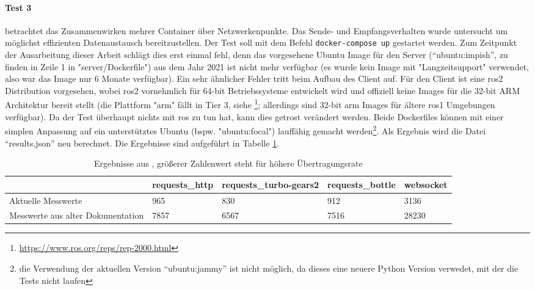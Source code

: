 \paragraph*{Test 3} betrachtet das Zusammenwirken mehrer Container über Netzwerkenpunkte. Das Sende- und Empfangsverhalten wurde untersucht um möglichst effizienten Datenaustausch bereitzustellen. Der Test soll mit dem Befehl \texttt{docker-compose up} gestartet werden. Zum Zeitpunkt der Ausarbeitung dieser Arbeit schlägt dies erst einmal fehl, denn das vorgesehene Ubuntu Image für den Server (\enquote{ubuntu:impish}, zu finden in Zeile 1 in "server/Dockerfile") aus dem Jahr 2021 ist nicht mehr verfügbar (es wurde kein Image mit "Langzeitsupport" verwendet, also war das Image nur 6 Monate verfügbar). Ein sehr ähnlicher Fehler tritt beim Aufbau des Client auf. Für den Client ist eine \acrshort{ros}2 Distribution vorgesehen, wobei \acrshort{ros}2 vornehmlich für 64-bit Betriebssysteme entwickelt wird und offiziell keine Images für die 32-bit ARM Architektur bereit stellt (die Plattform "arm" fällt in Tier 3, siehe \footnote{\url{https://www.ros.org/reps/rep-2000.html}}; allerdings sind 32-bit arm Images für ältere \acrshort{ros}1 Umgebungen verfügbar). Da der Test überhaupt nichts mit \acrshort{ros} zu tun hat, kann dies getrost verändert werden. Beide Dockerfiles können mit einer simplen Anpassung auf ein unterstütztes Ubuntu (bspw. "ubuntu:focal") lauffähig gemacht werden\footnote{die Verwendung der aktuellen Version \enquote{ubuntu:jammy} ist nicht möglich, da dieses eine neuere Python Version verwedet, mit der die Tests nicht laufen}. Als Ergebnis wird die Datei \enquote{results.json} neu berechnet. Die Ergebnisse sind aufgeführt in Tabelle \ref{tab:bench_http}. 

\begin{table}[h]
    \begin{minipage}{\linewidth}
    \caption{Ergebnisse aus \cite[Kapitel 6.13]{wirthErweiterungBestehendenDrohne2022a}, größerer Zahlenwert steht für höhere Übertragungsrate}
    \centering
    \label{tab:bench_http}
    \begin{tabularx}{\textwidth}{X|X|X|X|X}
        & {requests\_http} & {requests\_turbo-gears2} & {requests\_bottle} & {websocket} \\
        \hline 
        Aktuelle Messwerte & 965 &  830 & 912 & 3136\\
        {Messwerte aus alter Dokumentation} & 7857 & 6567 & 7516 & 28230\\
    \end{tabularx}
\end{minipage}
\end{table}

